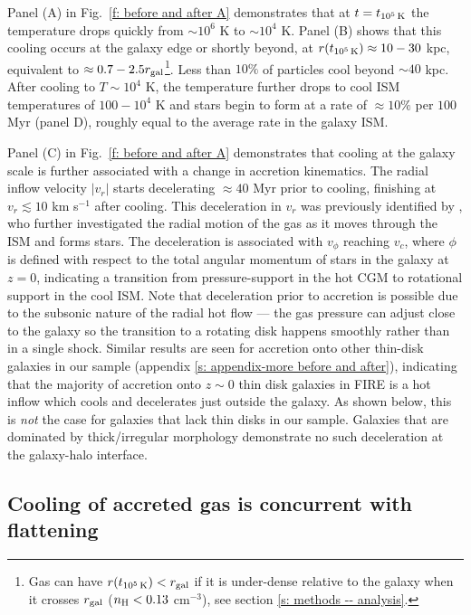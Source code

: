 \documentclass[fleqn,usenatbib]{mnras}
\newcommand{\tcools}{t_{10^5\,{\rm K}}}
\begin{document}
Panel (A) in Fig.~\ref{f: before and after A} demonstrates that at $t = \tcools$ the temperature drops quickly from ${\sim}10^6$ K to ${\sim}10^4$ K.
Panel (B) shows that this cooling occurs at the galaxy edge or shortly beyond, at $r(\tcools) \approx 10-30$ kpc, equivalent to $\approx0.7 - 2.5 r_{\rm gal}$\footnote{Gas can have $r(\tcools) < r_{\rm gal}$ if it is under-dense relative to the galaxy when it crosses $r_{\rm gal}$ ($n_{\rm H} < 0.13$ cm$^{-3}$), see section \ref{s: methods -- analysis}.}.
Less than $10\%$ of particles cool beyond $\sim 40$ kpc.
After cooling to $T \sim 10^4$ K, the temperature further drops to cool ISM temperatures of $100-10^4$ K and stars begin to form at a rate of $\approx10\%$ per $100$ Myr (panel D), roughly equal to the average rate in the galaxy ISM. 

Panel (C) in Fig.~\ref{f: before and after A} demonstrates that cooling at the galaxy scale is further associated with a change in accretion kinematics.
The radial inflow velocity $\vert v_r \vert $ starts decelerating $\approx40$ Myr prior to cooling, finishing at $v_{r} \lesssim10$ km s$^{-1}$ after cooling.
This deceleration in $v_r$ was previously identified by \citet{Trapp2021}, who further investigated the radial motion of the gas as it moves through the ISM and forms stars.
The deceleration is associated with $v_\phi$ reaching $v_c$, where $\phi$ is defined with respect to the total angular momentum of stars in the galaxy at $z=0$, indicating a transition from pressure-support in the hot CGM to rotational support in the cool ISM.
Note that deceleration prior to accretion is possible due to the subsonic nature of the radial hot flow --- the gas pressure can adjust close to the galaxy so the transition to a rotating disk happens smoothly rather than in a single shock.
Similar results are seen for accretion onto other thin-disk galaxies in our sample (appendix \ref{s: appendix-more before and after}), indicating that the majority of accretion onto $z\sim0$ thin disk galaxies in FIRE is a hot inflow which cools and decelerates just outside the galaxy.
As shown below, this is {\em not} the case for galaxies that lack thin disks in our sample. 
Galaxies that are dominated by thick/irregular morphology demonstrate no such deceleration at the galaxy-halo interface.


\subsection{Cooling of accreted gas is concurrent with flattening}
\label{s: characteristics -- aligns}
\end{document}
